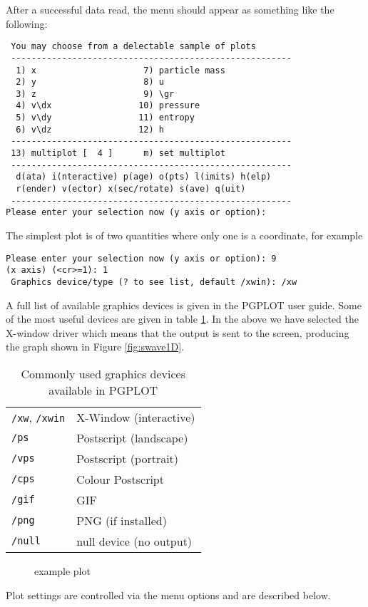 \documentclass[a4paper,12pt]{article}
\begin{document}
After a successful data read, the menu should appear as something like the
following:
\begin{verbatim}
 You may choose from a delectable sample of plots
 -------------------------------------------------------
  1) x                     7) particle mass
  2) y                     8) u
  3) z                     9) \gr
  4) v\dx                 10) pressure
  5) v\dy                 11) entropy
  6) v\dz                 12) h
 -------------------------------------------------------
 13) multiplot [  4 ]      m) set multiplot
 -------------------------------------------------------
  d(ata) i(nteractive) p(age) o(pts) l(imits) h(elp)
  r(ender) v(ector) x(sec/rotate) s(ave) q(uit)
 -------------------------------------------------------
Please enter your selection now (y axis or option):
\end{verbatim}
The simplest plot is of two quantities where only one is a coordinate, for
example
\begin{verbatim}
Please enter your selection now (y axis or option): 9
(x axis) (<cr>=1): 1
 Graphics device/type (? to see list, default /xwin): /xw
\end{verbatim}
 A full list of available graphics devices is given in the PGPLOT user guide.
Some of the most useful devices are given in table \ref{tab:devices}. In the
above we have selected the X-window driver which means that the output is sent to the
screen, producing the graph shown in Figure \ref{fig:swave1D}.
\begin{table}[h]
\centering
\begin{tabular}{|l|l|}
\hline
\verb+/xw+, \verb+/xwin+ & X-Window (interactive) \\
\verb+/ps+ & Postscript (landscape) \\
\verb+/vps+ & Postscript (portrait) \\
\verb+/cps+ & Colour Postscript \\
\verb+/gif+ & GIF \\
\verb+/png+ & PNG (if installed) \\
\verb+/null+ & null device (no output) \\
\hline
\end{tabular}
\caption{Commonly used graphics devices available in PGPLOT}
\label{tab:devices}
\end{table}

\begin{figure}
\centering
\caption{example plot}
\end{figure}
 Plot settings are controlled via the menu options and are described below. 
\end{document}

